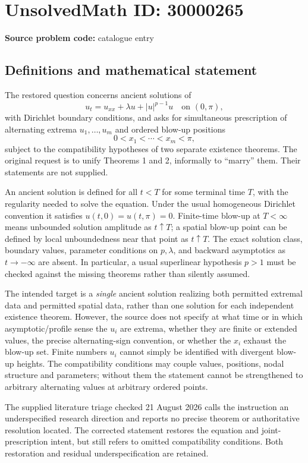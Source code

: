\documentclass[11pt]{article}
\begin{document}
\section*{UnsolvedMath ID: 30000265}
\textbf{Source problem code:} catalogue entry
\subsection{Definitions and mathematical statement}
The restored question concerns ancient solutions of
\[
 u_t=u_{xx}+\lambda u+|u|^{p-1}u\quad\text{on }(0,\pi),
\]
with Dirichlet boundary conditions, and asks for simultaneous prescription of alternating extrema $u_1,\ldots,u_m$ and ordered blow-up positions
\[
 0<x_1<\cdots<x_m<\pi,
\]
subject to the compatibility hypotheses of two separate existence theorems. The original request is to unify Theorems 1 and 2, informally to ``marry'' them. Their statements are not supplied.

An ancient solution is defined for all $t<T$ for some terminal time $T$, with the regularity needed to solve the equation. Under the usual homogeneous Dirichlet convention it satisfies $u(t,0)=u(t,\pi)=0$. Finite-time blow-up at $T<\infty$ means unbounded solution amplitude as $t\uparrow T$; a spatial blow-up point can be defined by local unboundedness near that point as $t\uparrow T$. The exact solution class, boundary values, parameter conditions on $p,\lambda$, and backward asymptotics as $t\to-\infty$ are absent. In particular, a usual superlinear hypothesis $p>1$ must be checked against the missing theorems rather than silently assumed.

The intended target is a \emph{single} ancient solution realizing both permitted extremal data and permitted spatial data, rather than one solution for each independent existence theorem. However, the source does not specify at what time or in which asymptotic/profile sense the $u_i$ are extrema, whether they are finite or extended values, the precise alternating-sign convention, or whether the $x_i$ exhaust the blow-up set. Finite numbers $u_i$ cannot simply be identified with divergent blow-up heights. The compatibility conditions may couple values, positions, nodal structure and parameters; without them the statement cannot be strengthened to arbitrary alternating values at arbitrary ordered points.

The supplied literature triage checked 21 August 2026 calls the instruction an underspecified research direction and reports no precise theorem or authoritative resolution located. The corrected statement restores the equation and joint-prescription intent, but still refers to omitted compatibility conditions. Both restoration and residual underspecification are retained.
\end{document}
